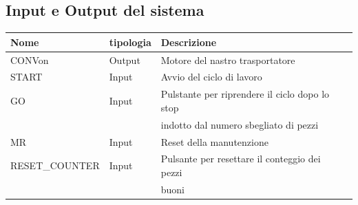 \documentclass{article}
\begin{document}
\subsection{Input e Output del sistema}
\begin{center}
    \begin{tabular}{l l l l }
        \toprule
        \textbf{Nome}  & \textbf{tipologia} & \textbf{Descrizione}                           \\
        \midrule
        \midrule
        CONVon         & Output             & Motore del nastro trasportatore                \\
        \midrule

        START          & Input              & Avvio del ciclo di lavoro                      \\
        \midrule

        GO             & Input              & Pulstante per riprendere il ciclo dopo lo stop \\
                       &                    & indotto dal numero sbegliato di pezzi          \\
        MR             & Input              & Reset della manutenzione                       \\
        \midrule
        RESET\_COUNTER & Input              & Pulsante per resettare il conteggio dei pezzi  \\
                       &                    & buoni                                          \\
        \bottomrule
    \end{tabular}
\end{center}
\end{document}
